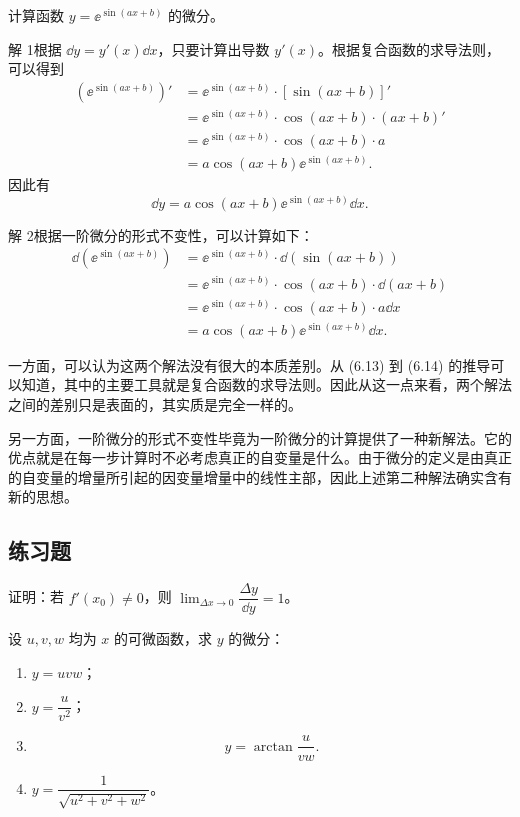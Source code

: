 \begin{xexample}[6.3.3]
计算函数 $y=\ee^{\sin(ax+b)}$ 的微分。
\end{xexample}
\begin{xsolution}
解 1\quad 根据 $\dd y=y'(x)\dd x$，只要计算出导数 $y'(x)$。根据复合函数的求导法则，可以得到
\begin{align*}
  (\ee^{\sin(ax+b)})'
  &=\ee^{\sin(ax+b)}\cdot[\sin(ax+b)]'\\
  &=\ee^{\sin(ax+b)}\cdot\cos(ax+b)\cdot(ax+b)'\\
  &=\ee^{\sin(ax+b)}\cdot\cos(ax+b)\cdot a\\
  &=a\cos(ax+b)\ee^{\sin(ax+b)}.
\end{align*}
因此有
\[
  \dd y=a\cos(ax+b)\ee^{\sin(ax+b)}\dd x.
\]

解 2\quad 根据一阶微分的形式不变性，可以计算如下：
\begin{align*}
  \dd(\ee^{\sin(ax+b)})
  &=\ee^{\sin(ax+b)}\cdot\dd(\sin(ax+b))\\
  &=\ee^{\sin(ax+b)}\cdot\cos(ax+b)\cdot\dd(ax+b)\\
  &=\ee^{\sin(ax+b)}\cdot\cos(ax+b)\cdot a\dd x\\
  &=a\cos(ax+b)\ee^{\sin(ax+b)}\dd x.
\end{align*}
\end{xsolution}

\begin{xremark}
一方面，可以认为这两个解法没有很大的本质差别。从 (6.13) 到 (6.14) 的推导可以知道，其中的主要工具就是复合函数的求导法则。因此从这一点来看，两个解法之间的差别只是表面的，其实质是完全一样的。

另一方面，一阶微分的形式不变性毕竟为一阶微分的计算提供了一种新解法。它的优点就是在每一步计算时不必考虑真正的自变量是什么。由于微分的定义是由真正的自变量的增量所引起的因变量增量中的线性主部，因此上述第二种解法确实含有新的思想。
\end{xremark}

\subsection{练习题}

\begin{xexercise}[1]
证明：若 $f'(x_0)\ne0$，则 $\lim_{\Delta x\to0}\dfrac{\Delta y}{\dd y}=1$。
\end{xexercise}

\begin{xexercise}[2]
设 $u,v,w$ 均为 $x$ 的可微函数，求 $y$ 的微分：
  \begin{enumerate}[label=(\arabic*)]
    \item $y=uvw$；
    \item $y=\dfrac{u}{v^2}$；
    \item
    \[
      y=\arctan\frac{u}{vw}.
    \]
    \item $y=\dfrac1{\sqrt{u^2+v^2+w^2}}$。
  \end{enumerate}
\end{xexercise}

